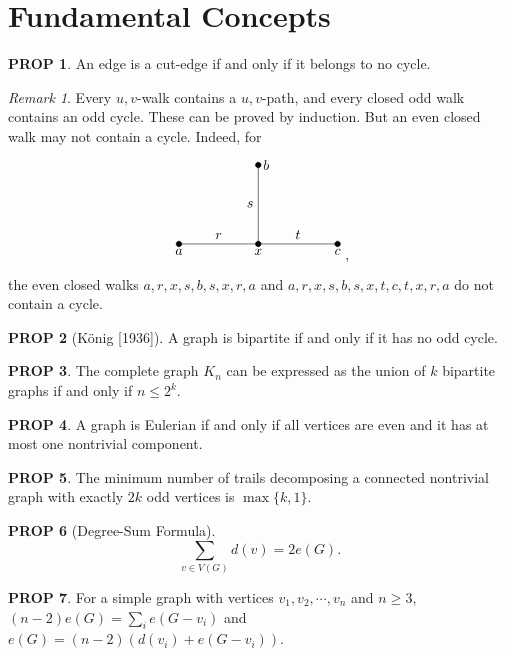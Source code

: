 \documentclass[11pt]{article}
\theoremstyle{definition}
\theoremstyle{dotles}
\theoremstyle{dotless}
\newtheorem{proposition}{PROP}[section]
\theoremstyle{remark}
\newtheorem{remark}{Remark}
\begin{document}
\section{Fundamental Concepts}

\begin{proposition}
An edge is a cut-edge if and only if it belongs to no cycle.
\end{proposition}

\begin{remark}
Every $u,v$-walk contains a $u,v$-path, and every closed odd walk contains an odd cycle. These can be proved by induction. But an even closed walk may not contain a cycle. Indeed, for
\[\begin{tikzpicture}
\filldraw(-2,0)circle(2pt)node[align=left,below]{$a$}--node[above]{$r$}++(2,0)circle(2pt)node[align=center,below]{$x$}--node[above]{$t$}++(2,0)(2,0)circle(2pt)node[align=right,below]{$c$};
\filldraw(0,2)circle(2pt)node[right]{$b$}--node[left]{$s$}(0,0);
\end{tikzpicture},\]
the even closed walks $a,r,x,s,b,s,x,r,a$ and $a,r,x,s,b,s,x,t,c,t,x,r,a$ do not contain a cycle.
\end{remark}

\begin{proposition}[König {[1936]}]
A graph is bipartite if and only if it has no odd cycle.
\end{proposition}

\begin{proposition}
The complete graph $K_n$ can be expressed as the union of $k$ bipartite graphs if and only if $n\leq2^k$.
\end{proposition}

\begin{proposition}
A graph is Eulerian if and only if all vertices are even and it has at most one nontrivial component.
\end{proposition}

\begin{proposition}
The minimum number of trails decomposing a connected nontrivial graph with exactly $2k$ odd vertices is $\max\{k,1\}$.
\end{proposition}

\begin{proposition}[Degree-Sum Formula]
\[\sum_{v\in V(G)}d(v)=2e(G).\]
\end{proposition}

\begin{proposition}
For a simple graph with vertices $v_1,v_2,\cdots,v_n$ and $n\geq3$, $(n-2)e(G)=\sum_ie(G-v_i)$ and $e(G)=(n-2)(d(v_i)+e(G-v_i))$.
\end{proposition}
\end{document}
